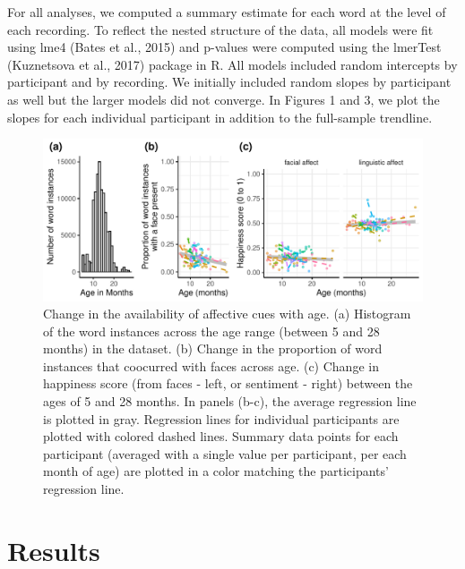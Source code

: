 \documentclass[10pt, letterpaper]{article}
\begin{document}
For all analyses, we computed a summary estimate for each word at the
level of each recording. To reflect the nested structure of the data,
all models were fit using lme4 (Bates et al., 2015) and p-values were
computed using the lmerTest (Kuznetsova et al., 2017) package in R. All
models included random intercepts by participant and by recording. We
initially included random slopes by participant as well but the larger
models did not converge. In Figures 1 and 3, we plot the slopes for each
individual participant in addition to the full-sample trendline.

\begin{CodeChunk}
\begin{figure}[h]

{\centering \includegraphics{figs/figure1-1} 

}

\caption[Change in the availability of affective cues with age]{Change in the availability of affective cues with age. (a) Histogram of the word instances across the age range (between 5 and 28 months) in the dataset. (b) Change in the proportion of word instances that coocurred with faces across age. (c) Change in happiness score (from faces - left, or sentiment - right) between the ages of 5 and 28 months. In panels (b-c), the average regression line is plotted in gray. Regression lines for individual participants are plotted with colored dashed lines. Summary data points for each participant (averaged with a single value per participant, per each month of age) are plotted in a color matching the participants’ regression line.}\label{fig:figure1}
\end{figure}
\end{CodeChunk}

\section{Results}\label{results}
\end{document}
